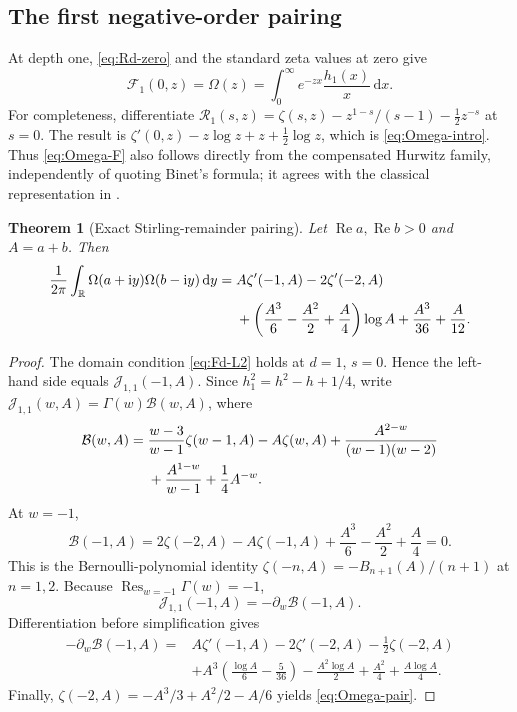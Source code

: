 \documentclass[11pt,a4paper]{article}
\newtheorem{theorem}{Theorem}[section]
\theoremstyle{definition}
\numberwithin{equation}{section}
\newcommand{\R}{\mathbb R}
\newcommand{\Rea}{\operatorname{Re}}
\newcommand{\Res}{\operatorname{Res}}
\newcommand{\dd}{\,\mathrm d}
\newcommand{\ii}{\mathrm i}
\begin{document}
\subsection{The first negative-order pairing}
At depth one, \eqref{eq:Rd-zero} and the standard zeta values at zero give
\begin{equation}\label{eq:Omega-F}
 \mathcal F_1(0,z)=\Omega(z)
    =\int_0^\infty e^{-zx}\frac{h_1(x)}x\dd x.
\end{equation}
For completeness, differentiate
$\mathcal R_1(s,z)=\zeta(s,z)-z^{1-s}/(s-1)-\frac12z^{-s}$ at $s=0$.
The result is
$\zeta'(0,z)-z\log z+z+\frac12\log z$, which is
\eqref{eq:Omega-intro}. Thus \eqref{eq:Omega-F} also follows directly
from the compensated Hurwitz family, independently of quoting Binet's
formula; it agrees with the classical representation in
\cite{dlmf-gamma}.

\begin{theorem}[Exact Stirling-remainder pairing]\label{thm:Omega-pair}
Let $\Rea a,\Rea b>0$ and $A=a+b$. Then
\begin{align}
 \frac1{2\pi}\int_{\R}\Omega(a+\ii y)\Omega(b-\ii y)\dd y
   ={}&A\zeta'(-1,A)-2\zeta'(-2,A)\notag\\
     &+\left(\frac{A^3}{6}-\frac{A^2}{2}+\frac A4\right)\log A
           +\frac{A^3}{36}+\frac A{12}.
                  \label{eq:Omega-pair}
\end{align}
\end{theorem}
\begin{proof}
The domain condition \eqref{eq:Fd-L2} holds at $d=1$, $s=0$.
Hence the left-hand side equals $\mathcal J_{1,1}(-1,A)$.
Since $h_1^2=h^2-h+1/4$, write
$\mathcal J_{1,1}(w,A)=\Gamma(w)\mathcal B(w,A)$, where
\begin{align}
 \mathcal B(w,A)={}&\frac{w-3}{w-1}\zeta(w-1,A)-A\zeta(w,A)
       +\frac{A^{2-w}}{(w-1)(w-2)}\notag\\
       &+\frac{A^{1-w}}{w-1}+\frac14A^{-w}.
                      \label{eq:B-Stirling}
\end{align}
At $w=-1$,
\[
 \mathcal B(-1,A)=2\zeta(-2,A)-A\zeta(-1,A)
                       +\frac{A^3}{6}-\frac{A^2}{2}+\frac A4=0.
\]
This is the Bernoulli-polynomial identity
$\zeta(-n,A)=-B_{n+1}(A)/(n+1)$ at $n=1,2$.
Because $\Res_{w=-1}\Gamma(w)=-1$,
\[
 \mathcal J_{1,1}(-1,A)=-\partial_w\mathcal B(-1,A).
\]
Differentiation before simplification gives
\begin{align*}
 -\partial_w\mathcal B(-1,A)={}&
 A\zeta'(-1,A)-2\zeta'(-2,A)-\tfrac12\zeta(-2,A)\\
 &+A^3\left(\frac{\log A}{6}-\frac5{36}\right)
       -\frac{A^2\log A}{2}+\frac{A^2}{4}+\frac{A\log A}{4}.
\end{align*}
Finally, $\zeta(-2,A)=-A^3/3+A^2/2-A/6$ yields
\eqref{eq:Omega-pair}.
\end{proof}
\end{document}
